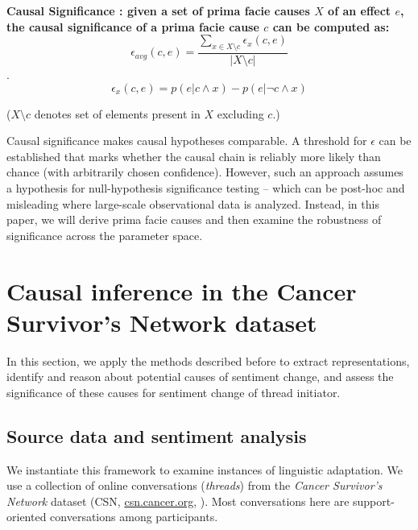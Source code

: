 \begin{defn}
\textbf{Causal Significance \parencite{kleinberg_uai09}: given a set of prima facie causes $X$ of an effect $e$, the causal significance of a prima facie cause $c$ can be computed as:}
\label{def:CausalSig}
\begin{equation}
\epsilon _{avg} (c,e) = \frac{\sum_{x\in X\setminus c} \epsilon _{x} (c,e) }{\left | X \setminus c \right |}
\end{equation}.
\begin{equation}
\epsilon _{x} (c,e) = p(e|c\wedge x)-p(e|\neg c\wedge x)
\end{equation}
\end{defn}

($X\setminus c$ denotes set of elements present in $X$ excluding $c$.)

Causal significance makes causal hypotheses comparable.  A threshold for $\epsilon$ can be established that marks whether the causal chain is reliably more likely than chance (with arbitrarily chosen confidence).  However, such an approach assumes a hypothesis for null-hypothesis significance testing -- which can be post-hoc and misleading where large-scale observational data is analyzed. Instead, in this paper, we will derive prima facie causes and then examine the robustness of significance across the parameter space.


\section{Causal inference in the Cancer Survivor's Network dataset}
In this section, we apply the methods described before to extract representations, identify and reason about potential causes of sentiment change, and assess the significance of these causes for sentiment change of thread initiator.

\subsection{Source data and sentiment analysis}

We instantiate this framework to examine instances of linguistic adaptation.  We use a collection of online conversations (\emph{threads}) from the \emph{Cancer Survivor's Network} dataset (CSN, \url{csn.cancer.org}, \cite{portier2013understanding}). Most conversations here are support-oriented conversations among participants.%

